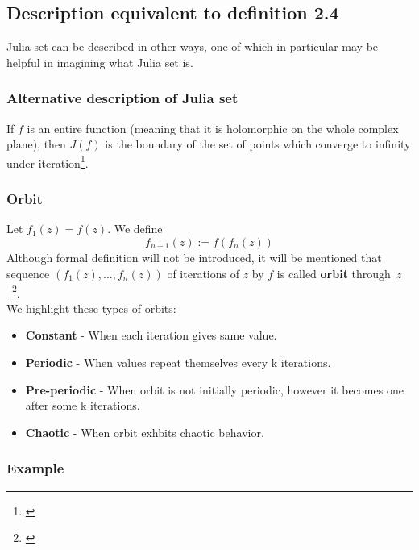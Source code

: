 \documentclass{article}
\begin{document}
\pagebreak
\subsection{Description equivalent to definition 2.4} \label{equivalent}
Julia set can be described in other ways, one of which in particular may be helpful in imagining what Julia set is.

\subsubsection{Alternative description of Julia set}
If $f$ is an entire function (meaning that it is holomorphic on the whole complex plane), then $J(f)$ is the boundary of the set of points which converge to infinity under iteration\footnote{\cite{Beardon}}.

\subsubsection{Orbit}
Let $f_{1}(z) = f(z)$. We define
\begin{equation}
	f_{n+1}(z):=f(f_{n}(z))
\end{equation}
Although formal definition will not be introduced, it will be mentioned that sequence $(f_{1}(z),\ldots,f_{n}(z))$ of iterations of $z$ by $f$ is called \textbf{orbit} through~$z$~\footnote{\cite{Heinz-OttoPeitgen2004}}.\\
We highlight these types of orbits:
\begin{itemize}
	\item \textbf{Constant} - When each iteration gives same value.
	\item \textbf{Periodic} - When values repeat themselves every k iterations.
	\item \textbf{Pre-periodic} - When orbit is not initially periodic, however it becomes one after some k iterations.
	\item \textbf{Chaotic} - When orbit exhbits chaotic behavior.
\end{itemize}

\pagebreak
\subsubsection{Example} \label{Example}
\end{document}
